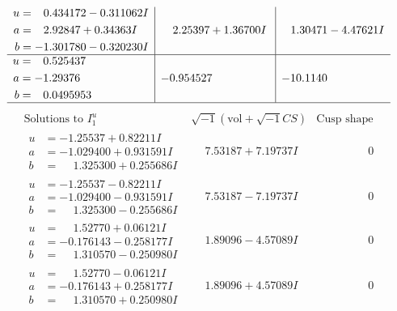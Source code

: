 \documentclass[1p]{elsarticle_modified}
\theoremstyle{definition}
\newcommand{\I}{\sqrt{-1}}
\begin{document}
$$\begin{array}{c|c|c}
\begin{aligned}
u &= \phantom{-}0.434172 - 0.311062 I \\
a &= \phantom{-}2.92847 + 0.34363 I \\
b &= -1.301780 - 0.320230 I\end{aligned}
 & \phantom{-}2.25397 + 1.36700 I & \phantom{-}1.30471 - 4.47621 I \\ \hline\begin{aligned}
u &= \phantom{-}0.525437\phantom{ +0.000000I} \\
a &= -1.29376\phantom{ +0.000000I} \\
b &= \phantom{-}0.0495953\phantom{ +0.000000I}\end{aligned}
 & -0.954527\phantom{ +0.000000I} & -10.1140\phantom{ +0.000000I}\\
 \hline 
 \end{array}$$\newpage$$\begin{array}{c|c|c}  
\text{Solutions to }I^u_{1}& \I (\text{vol} + \sqrt{-1}CS) & \text{Cusp shape}\\
 \hline 
\begin{aligned}
u &= -1.25537 + 0.82211 I \\
a &= -1.029400 + 0.931591 I \\
b &= \phantom{-}1.325300 + 0.255686 I\end{aligned}
 & \phantom{-}7.53187 + 7.19737 I & \phantom{-0.000000 } 0 \\ \hline\begin{aligned}
u &= -1.25537 - 0.82211 I \\
a &= -1.029400 - 0.931591 I \\
b &= \phantom{-}1.325300 - 0.255686 I\end{aligned}
 & \phantom{-}7.53187 - 7.19737 I & \phantom{-0.000000 } 0 \\ \hline\begin{aligned}
u &= \phantom{-}1.52770 + 0.06121 I \\
a &= -0.176143 - 0.258177 I \\
b &= \phantom{-}1.310570 - 0.250980 I\end{aligned}
 & \phantom{-}1.89096 - 4.57089 I & \phantom{-0.000000 } 0 \\ \hline\begin{aligned}
u &= \phantom{-}1.52770 - 0.06121 I \\
a &= -0.176143 + 0.258177 I \\
b &= \phantom{-}1.310570 + 0.250980 I\end{aligned}
 & \phantom{-}1.89096 + 4.57089 I & \phantom{-0.000000 } 0 \\ \hline\begin{aligned}

\end{aligned}
\end{array}$$
\end{document}
